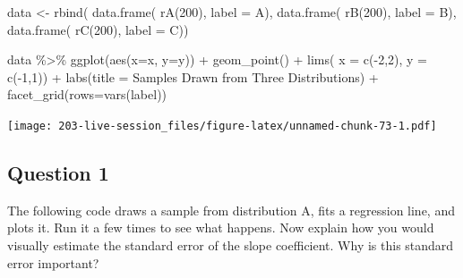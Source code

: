 \documentclass[
]{book}
\newenvironment{Shaded}{\begin{snugshade}}{\end{snugshade}}
\newcommand{\AttributeTok}[1]{\textcolor[rgb]{0.77,0.63,0.00}{#1}}
\newcommand{\DecValTok}[1]{\textcolor[rgb]{0.00,0.00,0.81}{#1}}
\newcommand{\FunctionTok}[1]{\textcolor[rgb]{0.00,0.00,0.00}{#1}}
\newcommand{\NormalTok}[1]{#1}
\newcommand{\OtherTok}[1]{\textcolor[rgb]{0.56,0.35,0.01}{#1}}
\newcommand{\SpecialCharTok}[1]{\textcolor[rgb]{0.00,0.00,0.00}{#1}}
\newcommand{\StringTok}[1]{\textcolor[rgb]{0.31,0.60,0.02}{#1}}
\theoremstyle{definition}
\theoremstyle{definition}
\theoremstyle{definition}
\theoremstyle{definition}
\theoremstyle{remark}
\begin{document}
\begin{Shaded}
\begin{Highlighting}[]
\NormalTok{data }\OtherTok{\textless{}{-}} \FunctionTok{rbind}\NormalTok{( }
  \FunctionTok{data.frame}\NormalTok{( }\FunctionTok{rA}\NormalTok{(}\DecValTok{200}\NormalTok{), }\AttributeTok{label =} \StringTok{\textquotesingle{}A\textquotesingle{}}\NormalTok{),}
  \FunctionTok{data.frame}\NormalTok{( }\FunctionTok{rB}\NormalTok{(}\DecValTok{200}\NormalTok{), }\AttributeTok{label =} \StringTok{\textquotesingle{}B\textquotesingle{}}\NormalTok{),}
  \FunctionTok{data.frame}\NormalTok{( }\FunctionTok{rC}\NormalTok{(}\DecValTok{200}\NormalTok{), }\AttributeTok{label =} \StringTok{\textquotesingle{}C\textquotesingle{}}\NormalTok{))}
\end{Highlighting}
\end{Shaded}

\begin{Shaded}
\begin{Highlighting}[]
\NormalTok{data }\SpecialCharTok{\%\textgreater{}\%} 
  \FunctionTok{ggplot}\NormalTok{(}\FunctionTok{aes}\NormalTok{(}\AttributeTok{x=}\NormalTok{x, }\AttributeTok{y=}\NormalTok{y)) }\SpecialCharTok{+} 
  \FunctionTok{geom\_point}\NormalTok{() }\SpecialCharTok{+} 
  \FunctionTok{lims}\NormalTok{(}
    \AttributeTok{x =} \FunctionTok{c}\NormalTok{(}\SpecialCharTok{{-}}\DecValTok{2}\NormalTok{,}\DecValTok{2}\NormalTok{), }
    \AttributeTok{y =} \FunctionTok{c}\NormalTok{(}\SpecialCharTok{{-}}\DecValTok{1}\NormalTok{,}\DecValTok{1}\NormalTok{)) }\SpecialCharTok{+} 
  \FunctionTok{labs}\NormalTok{(}\AttributeTok{title =} \StringTok{\textquotesingle{}Samples Drawn from Three Distributions\textquotesingle{}}\NormalTok{) }\SpecialCharTok{+} 
  \FunctionTok{facet\_grid}\NormalTok{(}\AttributeTok{rows=}\FunctionTok{vars}\NormalTok{(label))}
\end{Highlighting}
\end{Shaded}

\texttt{[image: 203-live-session\_files/figure-latex/unnamed-chunk-73-1.pdf]}

\hypertarget{question-1}{%
\subsection{Question 1}\label{question-1}}

The following code draws a sample from distribution A, fits a regression line, and plots it. Run it a few times to see what happens. Now explain how you would visually estimate the standard error of the slope coefficient. Why is this standard error important?
\end{document}
